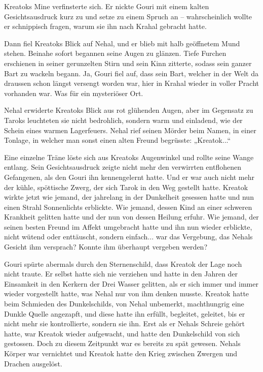 Kreatoks Mine verfinsterte sich. Er nickte Gouri mit einem kalten Gesichtsausdruck kurz zu und setze zu einem Spruch an – wahrscheinlich wollte er schnippisch fragen, warum sie ihn nach Krahal gebracht hatte.

Dann fiel Kreatoks Blick auf Nehal, und er blieb mit halb geöffnetem Mund stehen. Beinahe sofort begannen seine Augen zu glänzen. Tiefe Furchen erschienen in seiner gerunzelten Stirn und sein Kinn zitterte, sodass sein ganzer Bart zu wackeln begann. Ja, Gouri fiel auf, dass sein Bart, welcher in der Welt da draussen schon längst versengt worden war, hier in Krahal wieder in voller Pracht vorhanden war. Was für ein mysteriöser Ort.

Nehal erwiderte Kreatoks Blick aus rot glühenden Augen, aber im Gegensatz zu Taroks leuchteten sie nicht bedrohlich, sondern warm und einladend, wie der Schein eines warmen Lagerfeuers. Nehal rief seinen Mörder beim Namen, in einer Tonlage, in welcher man sonst einen alten Freund begrüsste: „Kreatok...“

Eine einzelne Träne löste sich aus Kreatoks Augenwinkel und rollte seine Wange entlang. Sein Gesichtsausdruck zeigte nicht mehr den verwirrten entflohenen Gefangenen, als den Gouri ihn kennengelernt hatte. Und er war auch nicht mehr der kühle, spöttische Zwerg, der sich Tarok in den Weg gestellt hatte. Kreatok wirkte jetzt wie jemand, der jahrelang in der Dunkelheit gesessen hatte und nun einen Strahl Sonnenlichts erblickte. Wie jemand, dessen Kind an einer schweren Krankheit gelitten hatte und der nun von dessen Heilung erfuhr. Wie jemand, der seinen besten Freund im Affekt umgebracht hatte und ihn nun wieder erblickte, nicht wütend oder enttäuscht, sondern einfach... war das Vergebung, das Nehals Gesicht ihm versprach? Konnte ihm überhaupt vergeben werden?

Gouri spürte abermals durch den Sternenschild, dass Kreatok der Lage noch nicht traute. Er selbst hatte sich nie verziehen und hatte in den Jahren der Einsamkeit in den Kerkern der Drei Wasser gelitten, als er sich immer und immer wieder vorgestellt hatte, was Nehal nur von ihm denken musste. Kreatok hatte beim Schmieden des Dunkelschilds, von Nehal unbemerkt, machthungrig eine Dunkle Quelle angezapft, und diese hatte ihn erfüllt, begleitet, geleitet, bis er nicht mehr sie kontrollierte, sondern sie ihn. Erst als er Nehals Schreie gehört hatte, war Kreatok wieder aufgewacht, und hatte den Dunkelschild von sich gestossen. Doch zu diesem Zeitpunkt war es bereits zu spät gewesen. Nehals Körper war vernichtet und Kreatok hatte den Krieg zwischen Zwergen und Drachen ausgelöst.

